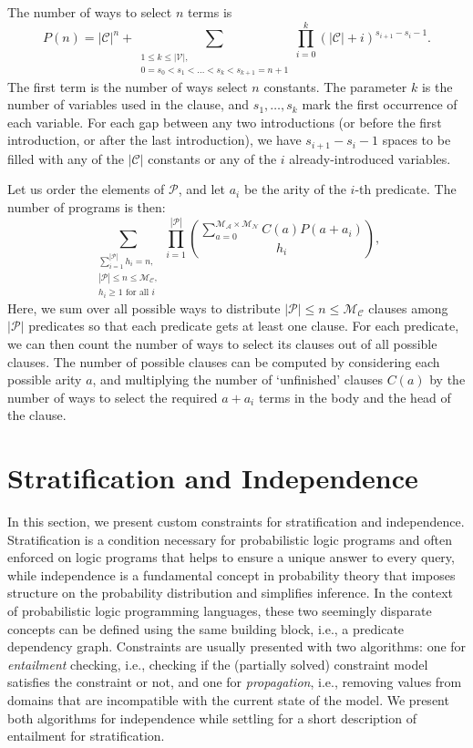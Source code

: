 \documentclass[runningheads]{llncs}
\newcommand{\predicates}{\mathcal{P}}
\newcommand{\variables}{\mathcal{V}}
\newcommand{\constants}{\mathcal{C}}
\newcommand{\maxArity}{\mathcal{M}_{\mathcal{A}}}
\newcommand{\maxNumNodes}{\mathcal{M}_{\mathcal{N}}}
\newcommand{\maxNumClauses}{\mathcal{M}_{\mathcal{C}}}
\begin{document}
The number of ways to select $n$ terms is
\[
  P(n) = |\constants{}|^n + \sum_{\substack{1 \le k \le |\variables{}|, \\ 0 =
      s_0 < s_1 < \dots < s_k < s_{k+1} = n+1}} \prod_{i=0}^k (|\constants{}| +
  i)^{s_{i+1} - s_i - 1}.
\]
The first term is the number of ways select $n$ constants. The parameter $k$ is
the number of variables used in the clause, and $s_1, \dots, s_k$ mark the first
occurrence of each variable. For each gap between any two introductions (or
before the first introduction, or after the last introduction), we have
$s_{i+1}-s_i-1$ spaces to be filled with any of the $|\constants{}|$ constants
or any of the $i$ already-introduced variables.

Let us order the elements of $\predicates{}$, and let $a_i$ be the arity of the
$i$-th predicate. The number of programs is then:
\[
  \sum_{\substack{ \sum_{i=1}^{|\predicates{}|} h_i = n,\\
      |\predicates{}| \le n \le \maxNumClauses{},\\
      h_i \ge 1 \text{ for all } i}} \prod_{i=1}^{|\predicates{}|}
  \binom{\sum_{a=0}^{\maxArity{} \times \maxNumNodes{}} C(a) P(a+a_i)}{h_i},
\]
Here, we sum over all possible ways to distribute $|\predicates{}| \le n \le
\maxNumClauses{}$ clauses among $|\predicates{}|$ predicates so that each
predicate gets at least one clause. For each predicate, we can then count the
number of ways to select its clauses out of all possible clauses. The number of
possible clauses can be computed by considering each possible arity $a$, and
multiplying the number of `unfinished' clauses $C(a)$ by the number of ways to
select the required $a+a_i$ terms in the body and the head of the clause.

\section{Stratification and Independence} \label{sec:independence}

In this section, we present custom constraints for stratification and
independence. Stratification is a condition necessary for probabilistic logic
programs \cite{DBLP:conf/padl/MantadelisR17} and often enforced on logic
programs \cite{DBLP:journals/tcs/Bidoit91} that helps to ensure a unique answer
to every query, while independence is a fundamental concept in probability
theory that imposes structure on the probability distribution and simplifies
inference. In the context of probabilistic logic programming languages, these
two seemingly disparate concepts can be defined using the same building block,
i.e., a predicate dependency graph. Constraints are usually presented with two
algorithms: one for \emph{entailment} checking, i.e., checking if the (partially
solved) constraint model satisfies the constraint or not, and one for
\emph{propagation}, i.e., removing values from domains that are incompatible
with the current state of the model. We present both algorithms for independence
while settling for a short description of entailment for stratification.
\end{document}
